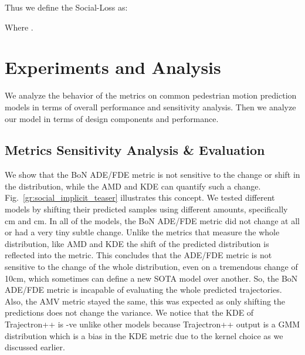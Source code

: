 \documentclass[runningheads]{llncs}
\begin{document}
Thus we define the Social-Loss as: 

Where .
\section{Experiments and Analysis }
We analyze the behavior of the metrics on common pedestrian motion prediction models in terms of overall performance and sensitivity analysis. Then we analyze our model in terms of design components and performance. 
\subsection{Metrics Sensitivity Analysis \& Evaluation }
We show that the BoN ADE/FDE metric is not sensitive to the change or shift in the distribution, while the AMD and KDE can quantify such a change. Fig.~\ref{gr:social_implicit_teaser} illustrates this concept. We tested different models by shifting their predicted samples using different amounts, specifically cm and cm. In all of the models, the BoN ADE/FDE metric did not change at all or had a very tiny subtle change. Unlike the metrics that measure the whole distribution, like AMD and KDE the shift of the predicted distribution is reflected into the metric. This concludes that the ADE/FDE metric is not sensitive to the change of the whole distribution, even on a tremendous change of 10cm, which sometimes can define a new SOTA model over another. So, the BoN ADE/FDE metric is incapable of evaluating the whole predicted trajectories. Also, the AMV metric stayed the same, this was expected as only shifting the predictions does not change the variance. We notice that the KDE of Trajectron++ is -ve unlike other models because Trajectron++ output is a GMM distribution which is a bias in the KDE metric due to the kernel choice as we discussed earlier.
\end{document}
